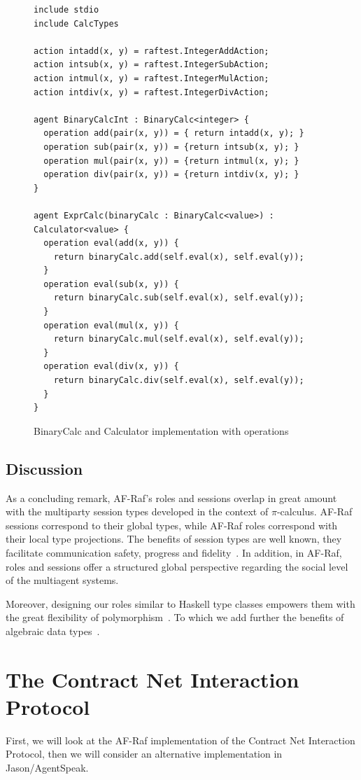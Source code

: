 \documentclass[a4paper,12pt,oneside,fleqn]{book} %
\begin{document}
{\begin{figure}\footnotesize %
\begin{verbatim}
include stdio
include CalcTypes

action intadd(x, y) = raftest.IntegerAddAction;
action intsub(x, y) = raftest.IntegerSubAction;
action intmul(x, y) = raftest.IntegerMulAction;
action intdiv(x, y) = raftest.IntegerDivAction;

agent BinaryCalcInt : BinaryCalc<integer> {
  operation add(pair(x, y)) = { return intadd(x, y); }
  operation sub(pair(x, y)) = {return intsub(x, y); }
  operation mul(pair(x, y)) = {return intmul(x, y); }
  operation div(pair(x, y)) = {return intdiv(x, y); }
}

agent ExprCalc(binaryCalc : BinaryCalc<value>) : Calculator<value> {
  operation eval(add(x, y)) {
    return binaryCalc.add(self.eval(x), self.eval(y));
  }
  operation eval(sub(x, y)) {
    return binaryCalc.sub(self.eval(x), self.eval(y));
  }
  operation eval(mul(x, y)) {
    return binaryCalc.mul(self.eval(x), self.eval(y));
  }
  operation eval(div(x, y)) {
    return binaryCalc.div(self.eval(x), self.eval(y));
  }
}
\end{verbatim}
\caption{BinaryCalc and Calculator implementation with operations}
\label{fig:calc-op}
\end{figure} %
\subsection{Discussion} %
As a concluding remark, AF-Raf's roles and sessions overlap in great amount
with the multiparty session types developed in the context of
$\pi$-calculus. AF-Raf sessions correspond to their global types, while
AF-Raf roles correspond with their local type projections. The benefits of
session types are well known, they facilitate communication safety,
progress and fidelity~\cite{dblp:conf/popl/hondayc08}. In addition, in
AF-Raf, roles and sessions offer a structured global perspective regarding
the social level of the multiagent systems.

Moreover, designing our roles similar to Haskell type classes empowers them
with the great flexibility of polymorphism~\cite{DBLP:conf/popl/WadlerB89}.
To which we add further the benefits of algebraic data
types~\cite{DBLP:journals/acta/GuttagH78}.
\section{The Contract Net Interaction Protocol}\label{sc:contractNet} %
First, we will look at the AF-Raf implementation of the Contract Net
Interaction Protocol, then we will consider an alternative implementation
in Jason/AgentSpeak.

}
\end{document}
